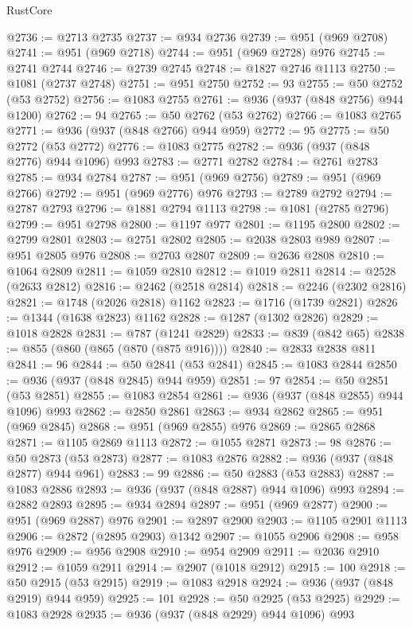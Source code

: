 \begin{lexlean}{RustCore}
\begin{coremodule}
@2736 := @2713 @2735
@2737 := @934 @2736
@2739 := @951 (@969 @2708)
@2741 := @951 (@969 @2718)
@2744 := @951 (@969 @2728) @976
@2745 := @2741 @2744
@2746 := @2739 @2745
@2748 := @1827 @2746 @1113
@2750 := @1081 (@2737 @2748)
@2751 := @951 @2750
@2752 := 93
@2755 := @50 @2752 (@53 @2752)
@2756 := @1083 @2755
@2761 := @936 (@937 (@848 @2756) @944 @1200)
@2762 := 94
@2765 := @50 @2762 (@53 @2762)
@2766 := @1083 @2765
@2771 := @936 (@937 (@848 @2766) @944 @959)
@2772 := 95
@2775 := @50 @2772 (@53 @2772)
@2776 := @1083 @2775
@2782 := @936 (@937 (@848 @2776) @944 @1096) @993
@2783 := @2771 @2782
@2784 := @2761 @2783
@2785 := @934 @2784
@2787 := @951 (@969 @2756)
@2789 := @951 (@969 @2766)
@2792 := @951 (@969 @2776) @976
@2793 := @2789 @2792
@2794 := @2787 @2793
@2796 := @1881 @2794 @1113
@2798 := @1081 (@2785 @2796)
@2799 := @951 @2798
@2800 := @1197 @977
@2801 := @1195 @2800
@2802 := @2799 @2801
@2803 := @2751 @2802
@2805 := @2038 @2803 @989
@2807 := @951 @2805 @976
@2808 := @2703 @2807
@2809 := @2636 @2808
@2810 := @1064 @2809
@2811 := @1059 @2810
@2812 := @1019 @2811
@2814 := @2528 (@2633 @2812)
@2816 := @2462 (@2518 @2814)
@2818 := @2246 (@2302 @2816)
@2821 := @1748 (@2026 @2818) @1162
@2823 := @1716 (@1739 @2821)
@2826 := @1344 (@1638 @2823) @1162
@2828 := @1287 (@1302 @2826)
@2829 := @1018 @2828
@2831 := @787 (@1241 @2829)
@2833 := @839 (@842 @65)
@2838 := @855 (@860 (@865 (@870 (@875 @916))))
@2840 := @2833 @2838 @811
@2841 := 96
@2844 := @50 @2841 (@53 @2841)
@2845 := @1083 @2844
@2850 := @936 (@937 (@848 @2845) @944 @959)
@2851 := 97
@2854 := @50 @2851 (@53 @2851)
@2855 := @1083 @2854
@2861 := @936 (@937 (@848 @2855) @944 @1096) @993
@2862 := @2850 @2861
@2863 := @934 @2862
@2865 := @951 (@969 @2845)
@2868 := @951 (@969 @2855) @976
@2869 := @2865 @2868
@2871 := @1105 @2869 @1113
@2872 := @1055 @2871
@2873 := 98
@2876 := @50 @2873 (@53 @2873)
@2877 := @1083 @2876
@2882 := @936 (@937 (@848 @2877) @944 @961)
@2883 := 99
@2886 := @50 @2883 (@53 @2883)
@2887 := @1083 @2886
@2893 := @936 (@937 (@848 @2887) @944 @1096) @993
@2894 := @2882 @2893
@2895 := @934 @2894
@2897 := @951 (@969 @2877)
@2900 := @951 (@969 @2887) @976
@2901 := @2897 @2900
@2903 := @1105 @2901 @1113
@2906 := @2872 (@2895 @2903) @1342
@2907 := @1055 @2906
@2908 := @958 @976
@2909 := @956 @2908
@2910 := @954 @2909
@2911 := @2036 @2910
@2912 := @1059 @2911
@2914 := @2907 (@1018 @2912)
@2915 := 100
@2918 := @50 @2915 (@53 @2915)
@2919 := @1083 @2918
@2924 := @936 (@937 (@848 @2919) @944 @959)
@2925 := 101
@2928 := @50 @2925 (@53 @2925)
@2929 := @1083 @2928
@2935 := @936 (@937 (@848 @2929) @944 @1096) @993

\end{coremodule}
\end{lexlean}
